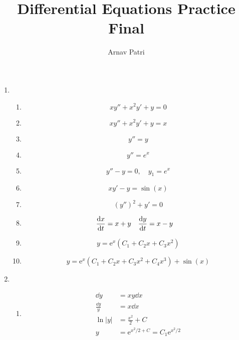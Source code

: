 \documentclass[12pt, A4]{article}
\title{Differential Equations Practice Final}
\author{Arnav Patri}
\newcommand{\en}{\text{e}}
\newcommand{\comment}[1]{}
\begin{document}
	\maketitle
	\begin{enumerate}[Q1]
		\item	
			\begin{enumerate}[1.]
				\item
					\[xy'' + x^2y' + y = 0\]
				\item
					\[xy'' + x^2y' + y = x\]
				\item
					\[y'' = y\]
				\item
					\[y'' = e^x\]
				\item
					\[y'' - y = 0, \quad y_1 = e^x\]
				\item
					\[xy' - y = \sin(x)\]
				\item
					\[(y'')^2 + y' = 0\]
				\item
					\begin{align*}
						\dv{x}{t} &= x + y &
								\dv{y}{t} &= x - y	
					\end{align*}
				\item
					\[y = \en^{x}(C_1 + C_2x + C_3x^2)\]
				\item
					\[y = \en^{x}(C_1 + C_2x + C_3x^2 + C_4x^3) + \sin(x)\]
			\end{enumerate}
		\item
			\begin{enumerate}[1.]
				\item
					\begin{align*}
						\dd{y} &= xy\dd{x} \\
						\frac{\dd{y}}{y} &= x\dd{x} \\
						\ln|y| &= \frac{x^2}{2} + C \\
						y &= \en^{x^2/2 + C}
								= C_1\en^{x^2/2}	
					\end{align*}
				\comment{
					\item
						\begin{align*}
							xy' - y &= \frac{1}{x} \\
							y' - \frac{y}{x} &= \frac{1}{x^2} \\
							P(x) &= -\frac{1}{x} \\
							\int P(x) \dd{x} &= -\ln x \\
							\mu(x) &= \en^{\int P(x) \dd{x}}
									= \en^{-\ln x} = \frac{1}{x} \\
								f(x)\mu(x) &= \frac{1}{x^2} \times \frac{1}{x} 
										= \frac{1}{x^3} \\

\end{align*}}
\end{enumerate}
\end{enumerate}
\end{document}
